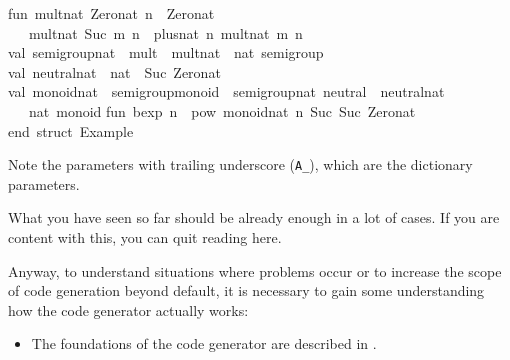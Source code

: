 \begin{isabellebody}
\begin{isamarkuptext}
\isanewline
fun\ mult{\isacharunderscore}nat\ Zero{\isacharunderscore}nat\ n\ {\isacharequal}\ Zero{\isacharunderscore}nat\isanewline
\ \ {\isacharbar}\ mult{\isacharunderscore}nat\ {\isacharparenleft}Suc\ m{\isacharparenright}\ n\ {\isacharequal}\ plus{\isacharunderscore}nat\ n\ {\isacharparenleft}mult{\isacharunderscore}nat\ m\ n{\isacharparenright}{\isacharsemicolon}\isanewline
\isanewline
val\ semigroup{\isacharunderscore}nat\ {\isacharequal}\ {\isacharbraceleft}mult\ {\isacharequal}\ mult{\isacharunderscore}nat{\isacharbraceright}\ {\isacharcolon}\ nat\ semigroup{\isacharsemicolon}\isanewline
\isanewline
val\ neutral{\isacharunderscore}nat\ {\isacharcolon}\ nat\ {\isacharequal}\ Suc\ Zero{\isacharunderscore}nat{\isacharsemicolon}\isanewline
\isanewline
val\ monoid{\isacharunderscore}nat\ {\isacharequal}\ {\isacharbraceleft}semigroup{\isacharunderscore}monoid\ {\isacharequal}\ semigroup{\isacharunderscore}nat{\isacharcomma}\ neutral\ {\isacharequal}\ neutral{\isacharunderscore}nat{\isacharbraceright}\isanewline
\ \ {\isacharcolon}\ nat\ monoid{\isacharsemicolon}\isanewline
\isanewline
fun\ bexp\ n\ {\isacharequal}\ pow\ monoid{\isacharunderscore}nat\ n\ {\isacharparenleft}Suc\ {\isacharparenleft}Suc\ Zero{\isacharunderscore}nat{\isacharparenright}{\isacharparenright}{\isacharsemicolon}\isanewline
\isanewline
end{\isacharsemicolon}\ {\isacharparenleft}{\isacharasterisk}struct\ Example{\isacharasterisk}{\isacharparenright}\isanewline%
\end{isamarkuptext}%
\isamarkuptrue%
%
\endisatagquotetypewriter
{\isafoldquotetypewriter}%
%
\isadelimquotetypewriter
%
\endisadelimquotetypewriter
%
\begin{isamarkuptext}%
\noindent Note the parameters with trailing underscore (\verb|A_|), which are the dictionary parameters.%
\end{isamarkuptext}%
\isamarkuptrue%
%
\isamarkuptrue%
%
\begin{isamarkuptext}%
What you have seen so far should be already enough in a lot of
  cases.  If you are content with this, you can quit reading here.

  Anyway, to understand situations where problems occur or to increase
  the scope of code generation beyond default, it is necessary to gain
  some understanding how the code generator actually works:

  \begin{itemize}

    \item The foundations of the code generator are described in
      .


\end{itemize}
\end{isamarkuptext}
\end{isabellebody}
